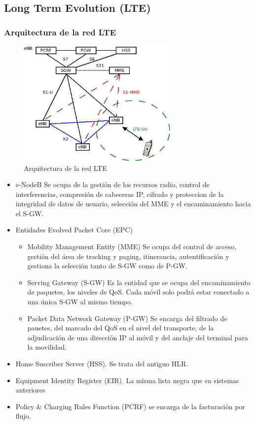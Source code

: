 \subsection{Long Term Evolution (LTE)}
\label{sub:LTE}
	\subsubsection{Arquitectura de la red LTE}
	\label{ssub:arquiLTE}
		\begin{figure}[htp]
			\centering
			\includegraphics[width=0.7\textwidth]{Imagen/diaLTE.jpg}
			\caption{Arquitectura de la red LTE}
		\end{figure}
		\begin{itemize}
			\item e-NodeB Se ocupa de la gestión de los recursos radio, control de interferencias, compresión de cabeceras IP, cifrado y proteccion de la integridad de datos de usuario, selección del MME y el encaminamiento hacia el S-GW.
			\item Entidades Evolved Packet Core (EPC)
			\begin{itemize}
				\item Mobility Management Entity (MME) Se ocupa del control de acceso, gestión del área de tracking y paging, itinerancia, autentificación y gestiona la selección tanto de S-GW como de P-GW.
				\item Serving Gateway (S-GW) Es la entidad que se ocupa del encaminamiento de paquetes, los niveles de QoS. Cada móvil solo podrá estar conectado a una única S-GW al mismo tiempo.
				\item Packet Data Network Gateway (P-GW) Se encarga del filtrado de pauetes, del marcado del QoS en el nivel del transporte, de la adjudicación de una dirección IP al móvil y del anclaje del terminal para la movilidad.
			\end{itemize}
			\item Home Suscriber Server (HSS). Se trata del antiguo HLR.
			\item Equipment Identity Register (EIR). La misma lista negra que en sistemas anteriores
			\item Policy \& Charging Rules Function (PCRF) se encarga de la facturación por flujo.
		\end{itemize}
